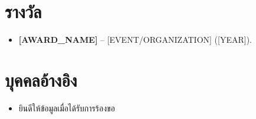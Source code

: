 \documentclass[11pt,a4paper,sans]{moderncv}
\begin{document}
\section{รางวัล}
\vspace{1pt}
\begin{itemize}
\item{\textbf{[AWARD_NAME]} -- [EVENT/ORGANIZATION] ([YEAR]).}
\end{itemize}


\section{บุคคลอ้างอิง}
\vspace{1pt}
\begin{itemize}
\item{ยินดีให้ข้อมูลเมื่อได้รับการร้องขอ}
\end{itemize}
\end{document}

